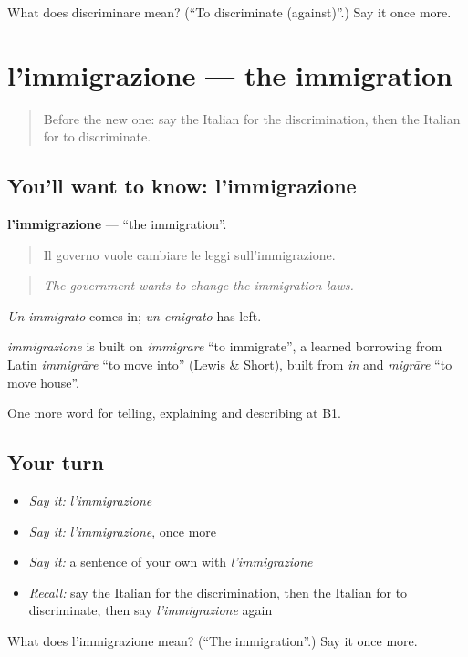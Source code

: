 \begin{tcolorbox}[breakable,colback=teal!4,colframe=teal!35!black,title={Before you move on}]
What does discriminare mean? (\textquotedblleft{}To discriminate (against)\textquotedblright{}.) Say it once more.
\end{tcolorbox}
\section[l'immigrazione]{l'immigrazione — the immigration}

\label{lesson:IT-C366-immigrazione}



\begin{quote}
Before the new one: say the Italian for the discrimination, then the Italian for to discriminate.
\end{quote}

\subsection*{You'll want to know: l'immigrazione}
\textbf{l'immigrazione} — \textquotedblleft{}the immigration\textquotedblright{}.

\begin{quote}
Il governo vuole cambiare le leggi sull'immigrazione.
\end{quote}

\begin{quote}
\emph{The government wants to change the immigration laws.}
\end{quote}

\emph{Un immigrato} comes in; \emph{un emigrato} has left.

\begin{cousinweb}
\emph{immigrazione} is built on \emph{immigrare} \textquotedblleft{}to immigrate\textquotedblright{}, a learned borrowing from Latin \emph{immigrāre} \textquotedblleft{}to move into\textquotedblright{} (Lewis \& Short), built from \emph{in} and \emph{migrāre} \textquotedblleft{}to move house\textquotedblright{}.
\end{cousinweb}

\begin{grammarlens}[title={What you've built}]
One more word for telling, explaining and describing at B1.
\end{grammarlens}

\subsection*{Your turn}
\begin{itemize}
\raggedright
  \item \emph{Say it:} \emph{l'immigrazione}
  \item \emph{Say it:} \emph{l'immigrazione}, once more
  \item \emph{Say it:} a sentence of your own with \emph{l'immigrazione}
  \item \emph{Recall:} say the Italian for the discrimination, then the Italian for to discriminate, then say \emph{l'immigrazione} again
\end{itemize}

\begin{tcolorbox}[breakable,colback=teal!4,colframe=teal!35!black,title={Before you move on}]
What does l'immigrazione mean? (\textquotedblleft{}The immigration\textquotedblright{}.) Say it once more.
\end{tcolorbox}
